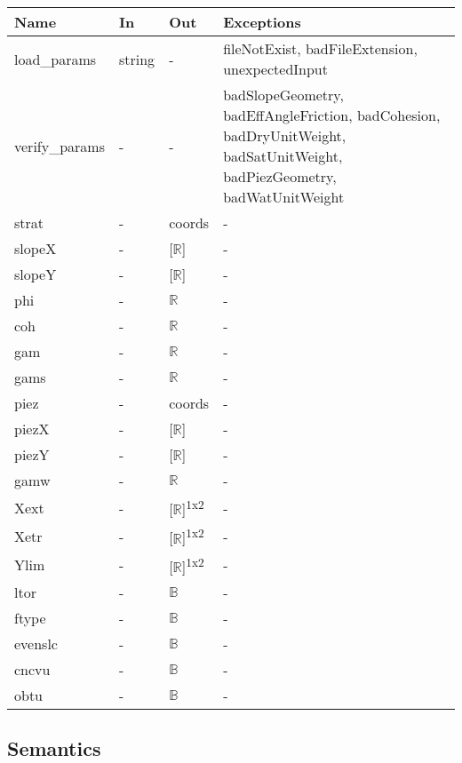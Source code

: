 \documentclass[12pt, titlepage]{article}
\begin{document}
\begin{center}
\renewcommand*{\arraystretch}{1.5}
\begin{tabular}{p{}  p{}  p{}  
p{} } \hline 

  \textbf{Name} & \textbf{In} & \textbf{Out} & \textbf{Exceptions} \\ \hline

   load\_params & string & - & 
   fileNotExist, badFileExtension, unexpectedInput  \\
   
   verify\_params & - & - & 
   badSlopeGeometry, badEffAngleFriction, badCohesion, badDryUnitWeight, 
   badSatUnitWeight, badPiezGeometry, badWatUnitWeight \\
   
   strat & - & coords & - \\
   slopeX & - & [$\mathbb{R}$] & - \\
   slopeY & - & [$\mathbb{R}$] & - \\
   phi & - & $\mathbb{R}$ & - \\
   coh & - & $\mathbb{R}$ & - \\
   gam & - & $\mathbb{R}$ & - \\
   gams & - & $\mathbb{R}$ & - \\
   piez & - & coords & - \\
   piezX & - & [$\mathbb{R}$] & - \\
   piezY & - & [$\mathbb{R}$] & - \\
   gamw & - & $\mathbb{R}$ & - \\
   Xext & - & [$\mathbb{R}$]\textsuperscript{1x2} & - \\
   Xetr & - & [$\mathbb{R}$]\textsuperscript{1x2} & - \\
   Ylim & - & [$\mathbb{R}$]\textsuperscript{1x2} & - \\
   ltor & - & $\mathbb{B}$ & - \\
   ftype & - & $\mathbb{B}$ & - \\
   evenslc & - & $\mathbb{B}$ & - \\
   cncvu & - & $\mathbb{B}$ & - \\
   obtu & - & $\mathbb{B}$ & - \\
   \hline

\end{tabular}
\end{center}

\subsection{Semantics}
\end{document}
